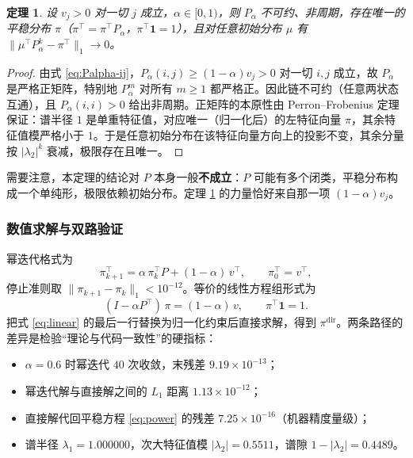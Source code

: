 \documentclass[12pt,a4paper]{ctexart}
\newtheorem{theorem}{定理}
\begin{document}
\begin{theorem}\label{thm:unique}
设 $v_j>0$ 对一切 $j$ 成立，$\alpha\in[0,1)$，则 $P_{\alpha}$ 不可约、非周期，存在唯一的平稳分布 $\pi$（$\pi^{\top}=\pi^{\top}P_{\alpha}$，$\pi^{\top}\mathbf{1}=1$），且对任意初始分布 $\mu$ 有 $\|\mu^{\top}P_{\alpha}^{k}-\pi^{\top}\|_1\to 0$。
\end{theorem}

\begin{proof}
由式 \eqref{eq:Palpha-ij}，$P_{\alpha}(i,j)\ge(1-\alpha)v_j>0$ 对一切 $i,j$ 成立，故 $P_{\alpha}$ 是严格正矩阵，特别地 $P_{\alpha}^{m}$ 对所有 $m\ge1$ 都严格正。因此链不可约（任意两状态互通），且 $P_{\alpha}(i,i)>0$ 给出非周期。正矩阵的本原性由 Perron--Frobenius 定理保证：谱半径 $1$ 是单重特征值，对应唯一（归一化后）的左特征向量 $\pi$，其余特征值模严格小于 $1$。于是任意初始分布在该特征向量方向上的投影不变，其余分量按 $|\lambda_2|^{k}$ 衰减，极限存在且唯一。
\end{proof}

需要注意，本定理的结论对 $P$ 本身一般\textbf{不成立}：$P$ 可能有多个闭类，平稳分布构成一个单纯形，极限依赖初始分布。定理 \ref{thm:unique} 的力量恰好来自那一项 $(1-\alpha)v_j$。

\subsubsection{数值求解与双路验证}

幂迭代格式为
\begin{equation}
\pi_{k+1}^{\top}=\alpha\,\pi_k^{\top}P+(1-\alpha)\,v^{\top},\qquad
\pi_0^{\top}=v^{\top},
\label{eq:power}
\end{equation}
停止准则取 $\|\pi_{k+1}-\pi_k\|_1<10^{-12}$。等价的线性方程组形式为
\begin{equation}
(I-\alpha P^{\top})\,\pi=(1-\alpha)\,v,\qquad \pi^{\top}\mathbf{1}=1 .
\label{eq:linear}
\end{equation}
把式 \eqref{eq:linear} 的最后一行替换为归一化约束后直接求解，得到 $\pi^{\mathrm{dir}}$。两条路径的差异是检验“理论与代码一致性”的硬指标：

\begin{itemize}[leftmargin=1.6em]
\item $\alpha=0.6$ 时幂迭代 $40$ 次收敛，末残差 $9.19\times10^{-13}$；
\item 幂迭代解与直接解之间的 $L_1$ 距离 $1.13\times10^{-12}$；
\item 直接解代回平稳方程 \eqref{eq:power} 的残差 $7.25\times10^{-16}$（机器精度量级）；
\item 谱半径 $\lambda_1=1.000000$，次大特征值模 $|\lambda_2|=0.5511$，谱隙 $1-|\lambda_2|=0.4489$。
\end{itemize}
\end{document}
